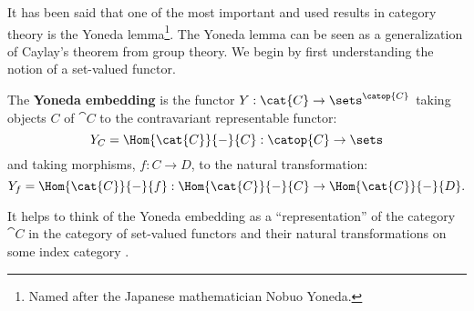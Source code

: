 It has been said that one of the most important and used results in
category theory is the Yoneda lemma\footnote{Named after the Japanese
  mathematician Nobuo Yoneda.}.  The Yoneda lemma can be seen as a
generalization of Caylay's theorem from group theory.  We begin by
first understanding the notion of a set-valued functor.

\begin{definition}
  \label{def:Yoneda-embedding}
  The \textbf{Yoneda embedding} is the functor $Y : \cat{C} \to
  \sets^{\catop{C}}$ taking objects $C$ of $\cat{C}$ to the
  contravariant representable functor:
  \[ Y_C = \Hom{\cat{C}}{-}{C} : \catop{C} \to \sets\]
  and taking morphisms, $f : C \to D$, to the natural transformation:
  \[Y_f = \Hom{\cat{C}}{-}{f} : \Hom{\cat{C}}{-}{C} \to \Hom{\cat{C}}{-}{D}.\]
\end{definition}
It helps to think of the Yoneda embedding as a ``representation'' of
the category $\cat{C}$ in the category of set-valued functors and
their natural transformations on some index category
\cite{awodey2006category}.

